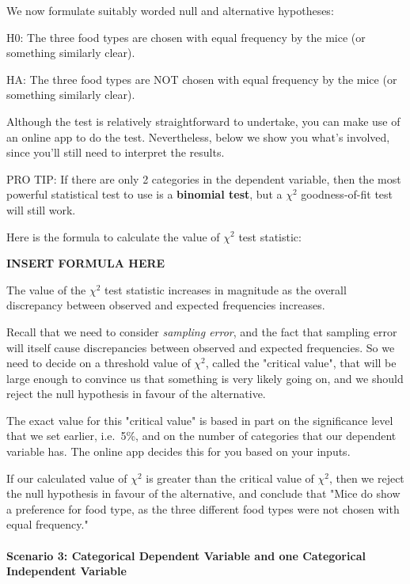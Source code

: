 \documentclass[
]{book}
\begin{document}
We now formulate suitably worded null and alternative hypotheses:

H0: The three food types are chosen with equal frequency by the mice (or something similarly clear).

HA: The three food types are NOT chosen with equal frequency by the mice (or something similarly clear).

Although the test is relatively straightforward to undertake, you can make use of an online app to do the test. Nevertheless, below we show you what's involved, since you'll still need to interpret the results.

PRO TIP: If there are only 2 categories in the dependent variable, then the most powerful statistical test to use is a \textbf{binomial test}, but a \(\chi{^2}\) goodness-of-fit test will still work.

Here is the formula to calculate the value of \(\chi{^2}\) test statistic:

\textbf{INSERT FORMULA HERE}

The value of the \(\chi{^2}\) test statistic increases in magnitude as the overall discrepancy between observed and expected frequencies increases.

Recall that we need to consider \emph{sampling error}, and the fact that sampling error will itself cause discrepancies between observed and expected frequencies. So we need to decide on a threshold value of \(\chi{^2}\), called the "critical value", that will be large enough to convince us that something is very likely going on, and we should reject the null hypothesis in favour of the alternative.

The exact value for this "critical value" is based in part on the significance level that we set earlier, i.e.~5\%, and on the number of categories that our dependent variable has. The online app decides this for you based on your inputs.

If our calculated value of \(\chi{^2}\) is greater than the critical value of \(\chi{^2}\), then we reject the null hypothesis in favour of the alternative, and conclude that "Mice do show a preference for food type, as the three different food types were not chosen with equal frequency."

\hypertarget{scenario-3-categorical-dependent-variable-and-one-categorical-independent-variable}{%
\paragraph*{Scenario 3: Categorical Dependent Variable and one Categorical Independent Variable}\label{scenario-3-categorical-dependent-variable-and-one-categorical-independent-variable}}
\end{document}

